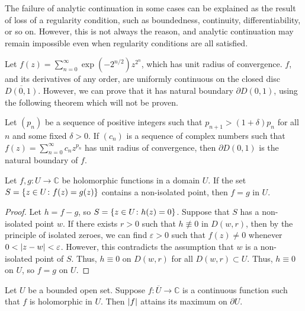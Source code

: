 The failure of analytic continuation in some cases can be explained as the result of loss of a regularity condition, such as boundedness, continuity, differentiability, or so on.
However, this is not always the reason, and analytic continuation may remain impossible even when regularity conditions are all satisfied.
\begin{example}
	Let \( f(z) = \sum_{n=0}^\infty \exp(-2^{n/2}) z^{2^n} \), which has unit radius of convergence.
	\( f \), and its derivatives of any order, are uniformly continuous on the closed disc \( \overline{D(0,1)} \).
	However, we can prove that it has natural boundary \( \partial D(0,1) \), using the following theorem which will not be proven.
	\begin{theorem}
		Let \( (p_n) \) be a sequence of positive integers such that \( p_{n+1} > (1+\delta)p_n \) for all \( n \) and some fixed \( \delta > 0 \).
		If \( (c_n) \) is a sequence of complex numbers such that \( f(z) = \sum_{n=0}^\infty c_n z^{p_n} \) has unit radius of convergence, then \( \partial D(0,1) \) is the natural boundary of \( f \).
	\end{theorem}
\end{example}
\begin{corollary}
	Let \( f, g \colon U \to \mathbb C \) be holomorphic functions in a domain \( U \).
	If the set \( S = \qty{z \in U \colon f(z) = g(z)} \) contains a non-isolated point, then \( f = g \) in \( U \).
\end{corollary}
\begin{proof}
	Let \( h = f - g \), so \( S = \qty{z \in U \colon h(z) = 0} \).
	Suppose that \( S \) has a non-isolated point \( w \).
	If there exists \( r > 0 \) such that \( h \not\equiv 0 \) in \( D(w,r) \), then by the principle of isolated zeroes, we can find \( \varepsilon > 0 \) such that \( f(z) \neq 0 \) whenever \( 0 < \abs{z-w} < \varepsilon \).
	However, this contradicts the assumption that \( w \) is a non-isolated point of \( S \).
	Thus, \( h \equiv 0 \) on \( D(w,r) \) for all \( D(w,r) \subset U \).
	Thus, \( h \equiv 0 \) on \( U \), so \( f = g \) on \( U \).
\end{proof}
\begin{corollary}
	Let \( U \) be a bounded open set.
	Suppose \( f \colon \overline U \to \mathbb C \) is a continuous function such that \( f \) is holomorphic in \( U \).
	Then \( \abs{f} \) attains its maximum on \( \partial U \).
\end{corollary}
